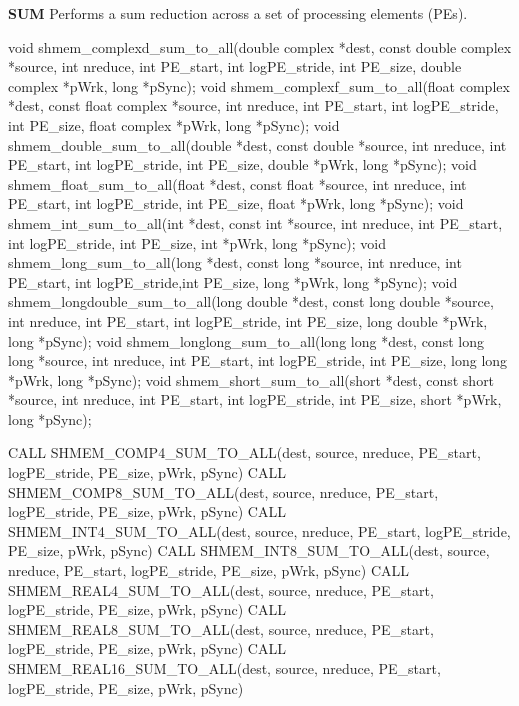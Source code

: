 \begin{apidefinition}
\bigskip
\textbf{SUM} \newline
Performs a sum reduction across a set of processing elements (\ac{PE}s).\newline
\begin{Csynopsis}
void shmem_complexd_sum_to_all(double complex *dest, const double complex *source, int nreduce, int PE_start, int logPE_stride, int PE_size, double complex *pWrk, long *pSync);
void shmem_complexf_sum_to_all(float complex *dest, const float complex *source, int nreduce, int PE_start, int logPE_stride, int PE_size, float complex *pWrk, long *pSync);
void shmem_double_sum_to_all(double *dest, const double *source, int nreduce, int PE_start, int logPE_stride, int PE_size, double *pWrk, long *pSync);
void shmem_float_sum_to_all(float *dest, const float *source, int nreduce, int PE_start, int logPE_stride, int PE_size, float *pWrk, long *pSync);
void shmem_int_sum_to_all(int *dest, const int *source, int nreduce, int PE_start, int logPE_stride, int PE_size, int *pWrk, long *pSync);
void shmem_long_sum_to_all(long *dest, const long *source, int nreduce, int PE_start, int logPE_stride,int PE_size, long *pWrk, long *pSync);
void shmem_longdouble_sum_to_all(long double *dest, const long double *source, int nreduce, int PE_start, int logPE_stride, int PE_size, long double *pWrk, long *pSync);
void shmem_longlong_sum_to_all(long long *dest, const long long *source, int nreduce, int PE_start, int logPE_stride, int PE_size, long long *pWrk, long *pSync);
void shmem_short_sum_to_all(short *dest, const short *source, int nreduce, int PE_start, int logPE_stride, int PE_size, short *pWrk, long *pSync);
\end{Csynopsis}

\begin{Fsynopsis}
CALL SHMEM_COMP4_SUM_TO_ALL(dest, source, nreduce, PE_start, logPE_stride, PE_size, pWrk, pSync)
CALL SHMEM_COMP8_SUM_TO_ALL(dest, source, nreduce, PE_start, logPE_stride, PE_size, pWrk, pSync)
CALL SHMEM_INT4_SUM_TO_ALL(dest, source, nreduce, PE_start, logPE_stride, PE_size, pWrk, pSync)
CALL SHMEM_INT8_SUM_TO_ALL(dest, source, nreduce, PE_start, logPE_stride, PE_size, pWrk, pSync)
CALL SHMEM_REAL4_SUM_TO_ALL(dest, source, nreduce, PE_start, logPE_stride, PE_size, pWrk, pSync)
CALL SHMEM_REAL8_SUM_TO_ALL(dest, source, nreduce, PE_start, logPE_stride, PE_size, pWrk, pSync)
CALL SHMEM_REAL16_SUM_TO_ALL(dest, source, nreduce, PE_start, logPE_stride, PE_size, pWrk, pSync)
\end{Fsynopsis}


\end{apidefinition}
